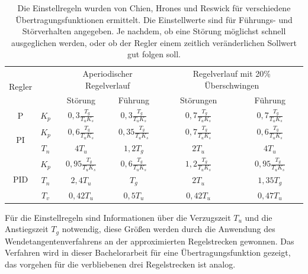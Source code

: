 		
		\begin{table}[]
		\centering
		\begin{tabular}{|c|c|c|c|c|c|}
			\hline
			\multirow{2}{*}{Regler} & \multirow{2}{*}{} & \multicolumn{2}{c|}{Aperiodischer Regelverlauf}                   & \multicolumn{2}{c|}{Regelverlauf mit 20\% Überschwingen}                  \\ \cline{3-6} 
			&                   & Störung                         & Führung                         & Störungen                               & Führung                         \\ \hline
			P                       & $K_{p}$           & $0{,}3 \frac{T_{g}}{T_{u}K_{s}}$  & $0{,}3 \frac{T_{g}}{T_{u}K_{s}}$  & \textit{$0{,}7 \frac{T_{g}}{T_{u}K_{s}}$} & $0{,}7 \frac{T_{g}}{T_{u}K_{s}}$  \\ \hline
			\multirow{2}{*}{PI}     & $K_{p}$           & $0{,}6 \frac{T_{g}}{T_{u}K_{s}}$  & $0{,}35 \frac{T_{g}}{T_{u}K_{s}}$ & $0{,}7 \frac{T_{g}}{T_{u}K_{s}}$          & $0{,}6 \frac{T_{g}}{T_{u}K_{s}}$  \\ \cline{2-6} 
			& $T_{n}$           & $4T_{u}$                        & $1{,}2T_{g}$                      & $2T_{u}$                                & $4T_{u}$                        \\ \hline
			\multirow{3}{*}{PID}    & $K_{p}$           & $0{,}95 \frac{T_{g}}{T_{u}K_{s}}$ & $0{,}6 \frac{T_{g}}{T_{u}K_{s}}$  & \textit{$1{,}2 \frac{T_{g}}{T_{u}K_{s}}$} & $0{,}95 \frac{T_{g}}{T_{u}K_{s}}$ \\ \cline{2-6} 
			& $T_{n}$           & $2{,}4T_{u}$                      & $T_{g}$                         & \textit{$2T_{u}$}                       & $1{,}35T_{g}$                     \\ \cline{2-6} 
			& $T_{v}$           & $0{,}42T_{u}$                     & $0{,}5T_{u}$                      & $0{,}42T_{u}$                             & $0{,}47T_{u}$                     \\ \hline
		\end{tabular}
		\caption{Die Einstellregeln wurden von Chien, Hrones und Reswick für verschiedene Übertragungsfunktionen ermittelt. Die Einstellwerte sind für Führungs- und Störverhalten angegeben. Je nachdem, ob eine Störung möglichst schnell ausgeglichen werden, oder ob der Regler einem zeitlich veränderlichen Sollwert gut folgen soll. \cite{praktischeregelungstechnik}}
		\label{tab: reswick}
	\end{table}
		
 			Für die Einstellregeln sind Informationen über die Verzugszeit $T_{u}$ und die Anstiegszeit $T_{g}$ notwendig, diese Größen werden durch die Anwendung des  Wendetangentenverfahrens an der approximierten Regelstrecken gewonnen. Das Verfahren wird in dieser Bachelorarbeit für eine Übertragungsfunktion gezeigt, das vorgehen für die verbliebenen drei Regelstrecken ist analog. \cite{unbehauen,praktischeregelungstechnik}
		
